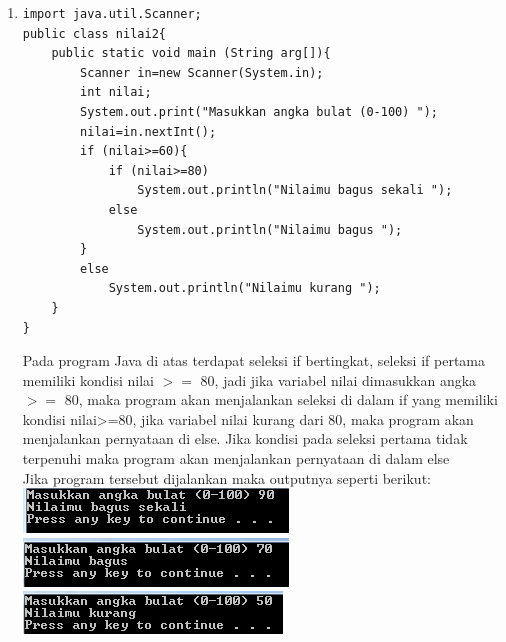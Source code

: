 \documentclass[a4paper,12pt]{article}
\begin{document}
\begin{enumerate}[label=\textbf{\arabic* .}]
            \newpage
        \item 
    \begin{lstlisting}[frame=single]
import java.util.Scanner;
public class nilai2{
	public static void main (String arg[]){
        Scanner in=new Scanner(System.in);
        int nilai;
        System.out.print("Masukkan angka bulat (0-100) ");
        nilai=in.nextInt();
        if (nilai>=60){
            if (nilai>=80)
                System.out.println("Nilaimu bagus sekali ");
            else
                System.out.println("Nilaimu bagus ");
        }
        else
            System.out.println("Nilaimu kurang ");
	}
}
            \end{lstlisting}
        Pada program Java di atas terdapat seleksi if bertingkat, seleksi if pertama memiliki kondisi nilai $>=$ 80, jadi jika variabel nilai dimasukkan angka $>=$ 80,
        maka program akan menjalankan 
        seleksi di dalam if yang memiliki kondisi nilai>=80, jika variabel nilai kurang dari 80, maka program akan menjalankan pernyataan di else. Jika kondisi pada seleksi pertama tidak
        terpenuhi maka program akan menjalankan pernyataan di dalam else\\
        Jika program tersebut dijalankan maka outputnya seperti berikut:\\
            \includegraphics{02b.PNG} \includegraphics{02c.PNG}
            \includegraphics{02d.PNG}


\end{enumerate}
\end{document}
